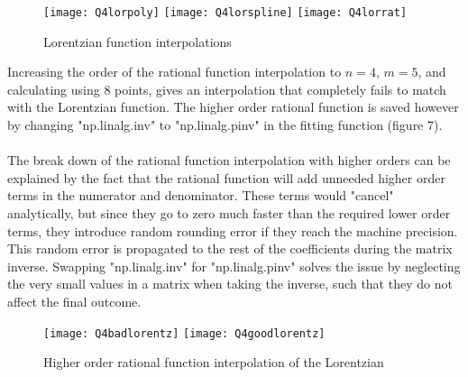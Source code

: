 \documentclass{article}
\newcommand{\<}[1]{\left\langle #1 \right\rangle }
\begin{document}
\begin{figure}[h]
	\caption{Lorentzian function interpolations}
	\centering
	\texttt{[image: Q4lorpoly]}
	\texttt{[image: Q4lorspline]}
	\texttt{[image: Q4lorrat]}
\end{figure}
Increasing the order of the rational function interpolation to $n=4$, $m=5$, and calculating using 8 points, gives an interpolation that completely fails to match with the Lorentzian function. The higher order rational function is saved however by changing "np.linalg.inv" to "np.linalg.pinv" in the fitting function (figure 7).\\
\\
The break down of the rational function interpolation with higher orders can be explained by the fact that the rational function will add unneeded higher order terms in the numerator and denominator. These terms would "cancel" analytically, but since they go to zero much faster than the required lower order terms, they introduce random rounding error if they reach the machine precision. This random error is propagated to the rest of the coefficients during the matrix inverse. Swapping "np.linalg.inv" for "np.linalg.pinv" solves the issue by neglecting the very small values in a matrix when taking the inverse, such that they do not affect the final outcome.
\begin{figure}[h]
	\caption{Higher order rational function interpolation of the Lorentzian}
	\centering
	\texttt{[image: Q4badlorentz]}
	\texttt{[image: Q4goodlorentz]}
\end{figure}
\end{document}

